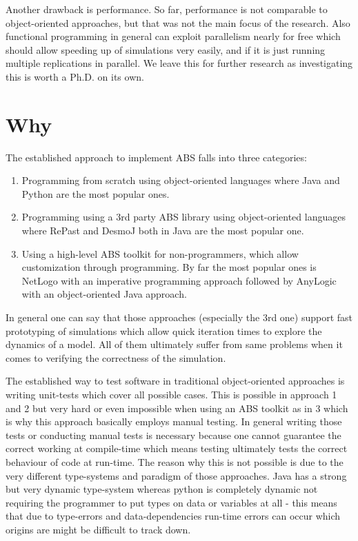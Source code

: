 Another drawback is performance. So far, performance is not comparable to object-oriented approaches, but that was not the main focus of the research. Also functional programming in general can exploit parallelism nearly for free which should allow speeding up of simulations very easily, and if it is just running multiple replications in parallel. We leave this for further research as investigating this is worth a Ph.D. on its own.

\section{Why}
The established approach to implement ABS falls into three categories:
\begin{enumerate}
	\item Programming from scratch using object-oriented languages where Java and Python are the most popular ones.
	\item Programming using a 3rd party ABS library using object-oriented languages where RePast and DesmoJ both in Java are the most popular one.
	\item Using a high-level ABS toolkit for non-programmers, which allow customization through programming. By far the most popular ones is NetLogo with an imperative programming approach followed by AnyLogic with an object-oriented Java approach.
\end{enumerate}

In general one can say that those approaches (especially the 3rd one) support fast prototyping of simulations which allow quick iteration times to explore the dynamics of a model. All of them ultimately suffer from same problems when it comes to verifying the correctness of the simulation.

The established way to test software in traditional object-oriented approaches is writing unit-tests which cover all possible cases. This is possible in approach 1 and 2 but very hard or even impossible when using an ABS toolkit as in 3 which is why this approach basically employs manual testing. In general writing those tests or conducting manual tests is necessary because one cannot guarantee the correct working at compile-time which means testing ultimately tests the correct behaviour of code at run-time. The reason why this is not possible is due to the very different type-systems and paradigm of those approaches. Java has a strong but very dynamic type-system whereas python is completely dynamic not requiring the programmer to put types on data or variables at all - this means that due to type-errors and data-dependencies run-time errors can occur which origins are might be difficult to track down.

